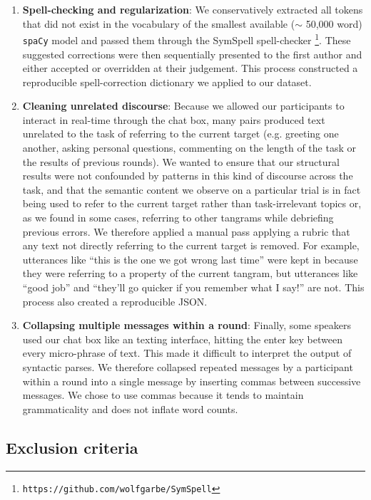 \begin{enumerate}

\item \textbf{Spell-checking and regularization}: We conservatively extracted all tokens that did not exist in the vocabulary of the smallest available ($\sim$ 50,000 word) \texttt{spaCy} model and passed them through the SymSpell spell-checker \footnote{\texttt{https://github.com/wolfgarbe/SymSpell}}. These suggested corrections were then sequentially presented to the first author and either accepted or overridden at their judgement. This process constructed a reproducible spell-correction dictionary we applied to our dataset.

\item \textbf{Cleaning unrelated discourse}: Because we allowed our participants to interact in real-time through the chat box, many pairs produced text unrelated to the task of referring to the current target (e.g. greeting one another, asking personal questions, commenting on the length of the task or the results of previous rounds). We wanted to ensure that our structural results were not confounded by patterns in this kind of discourse across the task, and that the semantic content we observe on a particular trial is in fact being used to refer to the current target rather than task-irrelevant topics or, as we found in some cases, referring to other tangrams while debriefing previous errors. We therefore applied a manual pass applying a rubric that any text not directly referring to the current target is removed. For example, utterances like ``this is the one we got wrong last time'' were kept in because they were referring to a property of the current tangram, but utterances like ``good job'' and ``they'll go quicker if you remember what I say!'' are not. This process also created a reproducible JSON.

\item \textbf{Collapsing multiple messages within a round}: Finally, some speakers used our chat box like an texting interface, hitting the enter key between every micro-phrase of text. This made it difficult to interpret the output of syntactic parses. We therefore collapsed repeated messages by a participant within a round into a single message by inserting commas between successive messages. We chose to use commas because it tends to maintain grammaticality and does not inflate word counts.

\end{enumerate}

\subsection{Exclusion criteria}


